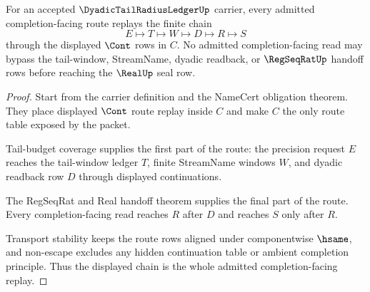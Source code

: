 \begin{theorem}
\label{thm:dyadic-tail-radius-ledger-route-replay}
For an accepted $\DyadicTailRadiusLedgerUp$ carrier, every admitted completion-facing route replays the finite chain
$$
E \longmapsto T \longmapsto W \longmapsto D \longmapsto R \longmapsto S
$$
through the displayed $\Cont$ rows in $C$. No admitted completion-facing read may bypass the tail-window, StreamName, dyadic readback, or $\RegSeqRatUp$ handoff rows before reaching the $\RealUp$ seal row.
\end{theorem}
\begin{proof}
Start from the carrier definition and the NameCert obligation theorem. They place displayed $\Cont$ route replay inside $C$ and make $C$ the only route table exposed by the packet.

Tail-budget coverage supplies the first part of the route: the precision request $E$ reaches the tail-window ledger $T$, finite StreamName windows $W$, and dyadic readback row $D$ through displayed continuations.

The RegSeqRat and Real handoff theorem supplies the final part of the route. Every completion-facing read reaches $R$ after $D$ and reaches $S$ only after $R$.

Transport stability keeps the route rows aligned under componentwise $\hsame$, and non-escape excludes any hidden continuation table or ambient completion principle. Thus the displayed chain is the whole admitted completion-facing replay.
\end{proof}

